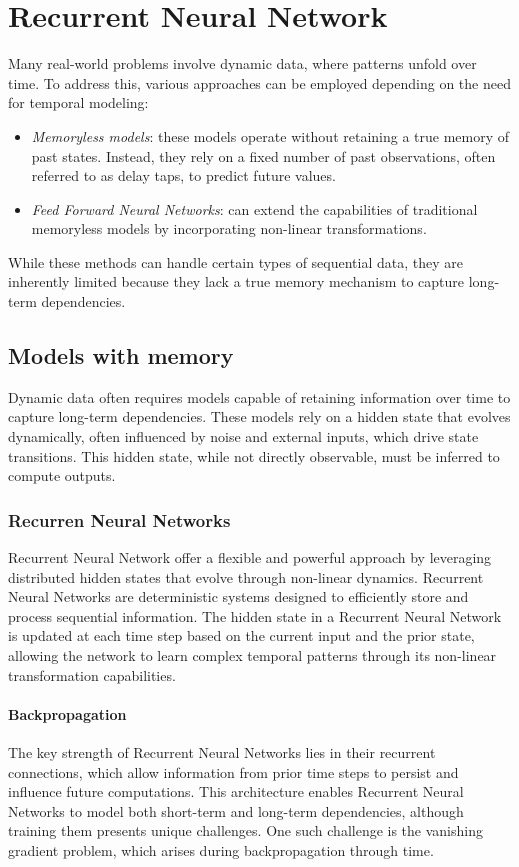 \section{Recurrent Neural Network}

Many real-world problems involve dynamic data, where patterns unfold over time. 
To address this, various approaches can be employed depending on the need for temporal modeling: 
\begin{itemize}
    \item \textit{Memoryless models}: these models operate without retaining a true memory of past states. 
        Instead, they rely on a fixed number of past observations, often referred to as delay taps, to predict future values. 
    \item \textit{Feed Forward Neural Networks}: can extend the capabilities of traditional memoryless models by incorporating non-linear transformations. 
\end{itemize}
While these methods can handle certain types of sequential data, they are inherently limited because they lack a true memory mechanism to capture long-term dependencies.

\subsection{Models with memory}
Dynamic data often requires models capable of retaining information over time to capture long-term dependencies. 
These models rely on a hidden state that evolves dynamically, often influenced by noise and external inputs, which drive state transitions.
This hidden state, while not directly observable, must be inferred to compute outputs.

\subsubsection{Recurren Neural Networks}
Recurrent Neural Network offer a flexible and powerful approach by leveraging distributed hidden states that evolve through non-linear dynamics. 
Recurrent Neural Networks are deterministic systems designed to efficiently store and process sequential information. 
The hidden state in a Recurrent Neural Network is updated at each time step based on the current input and the prior state, allowing the network to learn complex temporal patterns through its non-linear transformation capabilities.

\paragraph*{Backpropagation}
The key strength of Recurrent Neural Networks lies in their recurrent connections, which allow information from prior time steps to persist and influence future computations. 
This architecture enables Recurrent Neural Networks to model both short-term and long-term dependencies, although training them presents unique challenges. 
One such challenge is the vanishing gradient problem, which arises during backpropagation through time.

